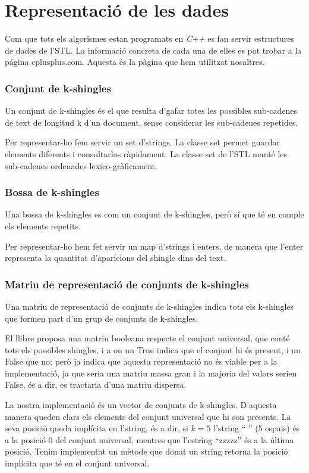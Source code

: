 \documentclass[a4paper, titlepage, 12pt]{report}
\begin{document}
\section{Representació de les dades}
Com que tots els algorismes estan programats en \textit{C++} es fan servir estructures de dades de l'STL. La informació concreta de cada una de elles es pot trobar a la página cplusplus.com. Aquesta és la pàgina que hem utilitzat nosaltres.

\subsubsection{Conjunt de k-shingles}
Un conjunt de k-shingles és el que resulta d'gafar totes les possibles sub-cadenes de text de longitud k d'un document, sense considerar les sub-cadenes repetides.

Per representar-ho fem servir un set d'strings. La classe set permet guardar elements diferents i consultarlos ràpidament. La classe set de l'STL manté les sub-cadenes ordenades lexico-gràficament.

\subsubsection{Bossa de k-shingles}
Una bossa de k-shingles es com un conjunt de k-shingles, però sí que té en comple els elements repetits.

Per representar-ho hem fet servir un map d'strings i enters, de manera que l'enter representa la quantitat d'aparicions del shingle dins del text.

\subsubsection{Matriu de representació de conjunts de k-shingles}
Una matriu de representació de conjunts de k-shingles indica tots els k-shingles que formen part d'un grup de conjunts de k-shingles.

El llibre proposa una matriu booleana respecte el conjunt universal, que conté tots els possibles shingles, i a on un True indica que el conjunt hi és present, i un False que no; però ja indica que aquesta representació no és viable per a la implementació, ja que seria una matriu massa gran i la majoria del valors serien False, és a dir, es tractaria d'una matriu dispersa.

La nostra implementació és un vector de conjunts de k-shingles. D'aquesta manera queden clars els elements del conjunt universal que hi son presents. La seva posició queda implícita en l'string, és a dir, si $k=5$ l'string ``     '' (5 espais) és a la posició 0 del conjunt universal, mentres que l'estring ``zzzzz'' és a la última posició. Tenim implementat un mètode que donat un string retorna la posició implícita que té en el conjunt universal.
\end{document}
